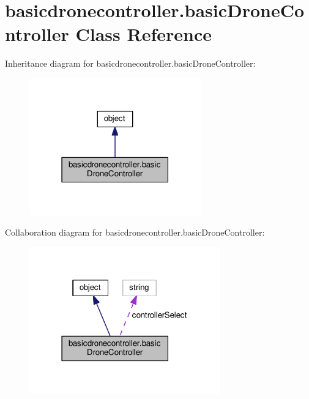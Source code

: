 \hypertarget{classbasicdronecontroller_1_1basicDroneController}{\section{basicdronecontroller.\-basic\-Drone\-Controller Class Reference}
\label{classbasicdronecontroller_1_1basicDroneController}
}


Inheritance diagram for basicdronecontroller.\-basic\-Drone\-Controller\-:
\nopagebreak
\begin{figure}[H]
\begin{center}
\leavevmode
\includegraphics[width=210pt]{classbasicdronecontroller_1_1basicDroneController__inherit__graph}
\end{center}
\end{figure}


Collaboration diagram for basicdronecontroller.\-basic\-Drone\-Controller\-:
\nopagebreak
\begin{figure}[H]
\begin{center}
\leavevmode
\includegraphics[width=234pt]{classbasicdronecontroller_1_1basicDroneController__coll__graph}
\end{center}
\end{figure}
